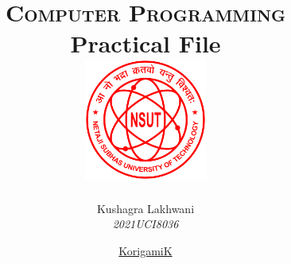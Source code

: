 \newcommand{\hmwkTitle}{Practical File} %
\newcommand{\hmwkClass}{Computer Programming} %
\newcommand{\hmwkDueDate}{Due\ Date} %

\date{\vfill \href{https://github.com/KorigamiK/CS-Assignments/}{KorigamiK}}

\title{
    \vspace{0.6in}
    \LARGE{\textsc{\hmwkClass}}\\
    \normalsize\vspace{0.1in}\small{\hmwkTitle}\\
    \vspace{1in}
    \includegraphics[width=0.3\textwidth]{./Images/NSUT.png}\\[0.1in]
    \vspace{0.7in}
}

\newcommand{\hmwkAuthorNameOne}{Kushagra Lakhwani}
\newcommand{\hmwkAuthorNumberOne}{2021UCI8036}

\author{
    \textmd{\hmwkAuthorNameOne}\\
    \textit{\hmwkAuthorNumberOne}
}
